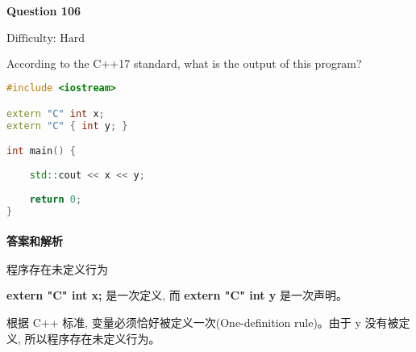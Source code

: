 \documentclass{article}
\begin{document}
	
	\paragraph*{Question 106} $\boxed{\text{Difficulty: Hard}} $			
	
	According to the C++17 standard, what is the output of this program?
	
	\begin{lstlisting}[language=C++]  		
#include <iostream>

extern "C" int x;
extern "C" { int y; }

int main() {
	
	std::cout << x << y;
	
	return 0;
}
	\end{lstlisting}
	
	
	\paragraph*{答案和解析} $\boxed{\text{程序存在未定义行为}} $
	
	\textbf{extern "C" int x;} 是一次定义, 而 \textbf{extern "C" {int y}} 是一次声明。
	
	根据 C++ 标准, 变量必须恰好被定义一次(One-definition rule)。由于 y 没有被定义, 所以程序存在未定义行为。
	
	
\end{document}
